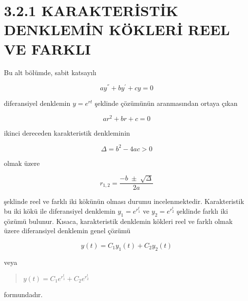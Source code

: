 \documentclass[12px]{article}
\begin{document}
\section*{3.2.1 KARAKTERİSTİK DENKLEMİN KÖKLERİ REEL VE FARKLI}\raggedright

\vspace*{10mm}
Bu alt bölümde, sabit katsayılı

\begin{equation*}
    ay^{''}+by^{'}+cy=0
\end{equation*}

diferansiyel denklemin $y=e^{rt}$ şeklinde çözümünün aranmasından ortaya çıkan 

\begin{equation*}
    ar^{2}+br+c=0
\end{equation*}
    
ikinci dereceden karakteristik denkleminin

\begin{equation*}
    \Delta=b^{2}-4ac > 0
\end{equation*}

olmak üzere

\begin{equation}
    r_{1,2}=\frac{-b\;\pm\;\sqrt{\Delta}}{2a}
\end{equation}

şeklinde reel ve farklı iki kökünün olması durumu incelenmektedir. Karakteristik bu iki kökü ile diferansiyel denklemin $y_{1}=e^{r_{1}^{t}}$ ve $y_{2}=e^{r_{2}^{t}}$ şeklinde farklı iki çözümü bulunur. Kısaca, karakteristik denklemin kökleri reel ve farklı olmak üzere diferansiyel denklemin genel çözümü 

\begin{equation*}
   y(t)=C_{1}y_{1}(t)+C_{2}y_{2}(t)
\end{equation*}

veya

\begin{quote}
    {\boldmath$y(t)=C_{1}e^{r_{1}^{t}}+C_{2}e^{r_{2}^{t}}$}
\end{quote}


formundadır.
\end{document}
